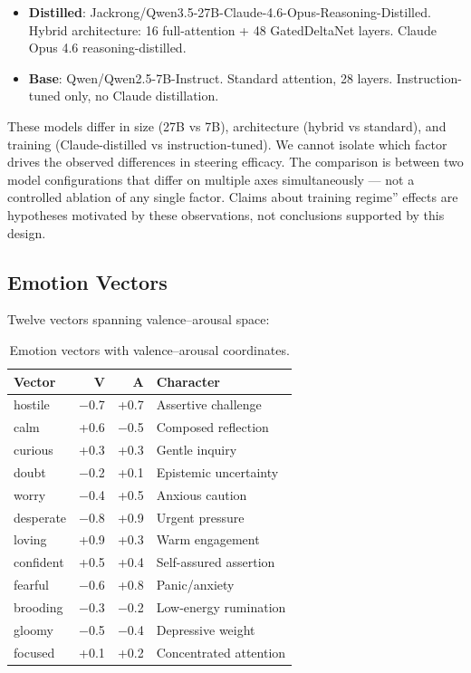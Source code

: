\documentclass[11pt,a4paper]{article}
\begin{document}
\begin{itemize}
\item \textbf{Distilled}: Jackrong/Qwen3.5-27B-Claude-4.6-Opus-Reasoning-Distilled.
Hybrid architecture: 16 full-attention + 48 GatedDeltaNet layers.
Claude Opus 4.6 reasoning-distilled.
\item \textbf{Base}: Qwen/Qwen2.5-7B-Instruct. Standard attention,
28 layers. Instruction-tuned only, no Claude distillation.
\end{itemize}

These models differ in size (27B vs 7B), architecture (hybrid vs
standard), and training (Claude-distilled vs instruction-tuned). We
cannot isolate which factor drives the observed differences in
steering efficacy. The comparison is between two model configurations
that differ on multiple axes simultaneously --- not a controlled
ablation of any single factor. Claims about training regime'' effects
are hypotheses motivated by these observations, not conclusions
supported by this design.

\subsection{Emotion Vectors}

Twelve vectors spanning valence--arousal space:

\begin{table}[h]
\centering
\caption{Emotion vectors with valence--arousal coordinates.}
\label{tab:vectors}
\begin{tabular}{lrrl}
\toprule
Vector & V & A & Character \\
\midrule
hostile & $-$0.7 & +0.7 & Assertive challenge \\
calm & +0.6 & $-$0.5 & Composed reflection \\
curious & +0.3 & +0.3 & Gentle inquiry \\
doubt & $-$0.2 & +0.1 & Epistemic uncertainty \\
worry & $-$0.4 & +0.5 & Anxious caution \\
desperate & $-$0.8 & +0.9 & Urgent pressure \\
loving & +0.9 & +0.3 & Warm engagement \\
confident & +0.5 & +0.4 & Self-assured assertion \\
fearful & $-$0.6 & +0.8 & Panic/anxiety \\
brooding & $-$0.3 & $-$0.2 & Low-energy rumination \\
gloomy & $-$0.5 & $-$0.4 & Depressive weight \\
focused & +0.1 & +0.2 & Concentrated attention \\
\bottomrule
\end{tabular}
\end{table}
\end{document}
